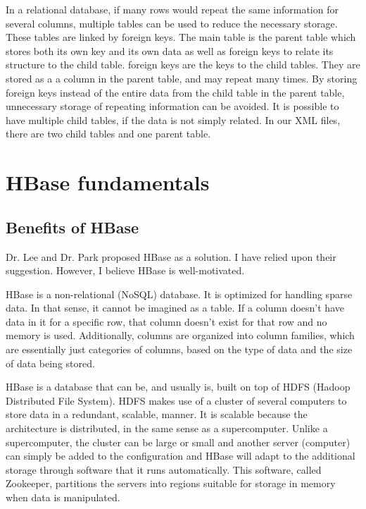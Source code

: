 \documentclass{article}
\begin{document}
In a relational database, if many rows would repeat the same
information for several columns, multiple tables can be used to reduce
the necessary storage. These tables are linked by foreign keys. The
main table is the parent table which stores both its own key and its
own data as well as foreign keys to relate its structure to the child
table.  foreign keys are the keys to the child tables. They are stored
as a a column in the parent table, and may repeat many times. By
storing foreign keys instead of the entire data from the child table
in the parent table, unnecessary storage of repeating information can
be avoided. It is possible to have multiple child tables, if the data
is not simply related. In our XML files, there are two child tables
and one parent table.


\section{HBase fundamentals}

\subsection{Benefits of HBase}

Dr. Lee and Dr. Park proposed HBase as a solution. I have relied upon their
suggestion. However, I believe HBase is well-motivated.

HBase is a non-relational (NoSQL) database. It is optimized for
handling sparse data. In that sense, it cannot be imagined as a
table. If a column doesn't have data in it for a specific row, that
column doesn't exist for that row and no memory is used. Additionally,
columns are organized into column families, which are essentially just
categories of columns, based on the type of data and the size of data
being stored.


HBase is a database that can be, and usually is, built on top of HDFS
(Hadoop Distributed File System). HDFS makes use of a cluster of
several computers to store data in a redundant, scalable, manner. It
is scalable because the architecture is distributed, in the same sense
as a supercomputer. Unlike a supercomputer, the cluster can be large
or small and another server (computer) can simply be added to the
configuration and HBase will adapt to the additional storage through
software that it runs automatically. This software, called Zookeeper,
partitions the servers into regions suitable for storage in memory
when data is manipulated.
\end{document}
